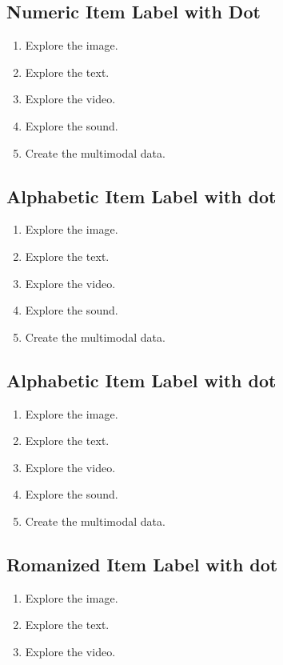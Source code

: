 \documentclass[11pt]{article}
\begin{document}
\subsection{Numeric Item Label with Dot}
\begin{enumerate}[nosep, label=\arabic*.]
\item Explore the image.
\item Explore the text.
\item Explore the video.
\item Explore the sound.
\item Create the multimodal data.
\end{enumerate}

\subsection{Alphabetic Item Label with dot}
\begin{enumerate}[nosep, label=\alph*.]
\item Explore the image.
\item Explore the text.
\item Explore the video.
\item Explore the sound.
\item Create the multimodal data.
\end{enumerate}


\subsection{Alphabetic Item Label with dot}
\begin{enumerate}[nosep, label=\Alph*.]
\item Explore the image.
\item Explore the text.
\item Explore the video.
\item Explore the sound.
\item Create the multimodal data.
\end{enumerate}

\subsection{Romanized Item Label with dot}
\begin{enumerate}[nosep, label=\roman*.]
\item Explore the image.
\item Explore the text.
\item Explore the video.
\end{enumerate}
\end{document}
